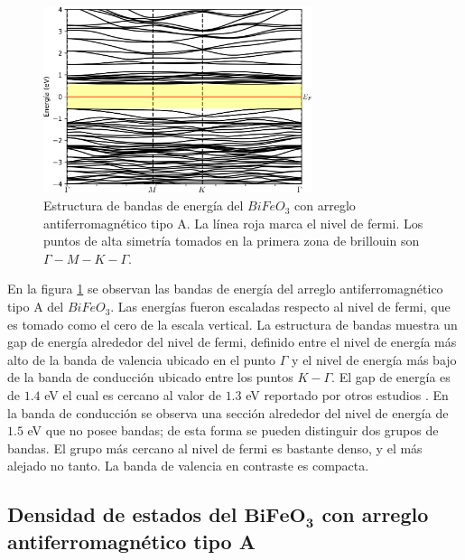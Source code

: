 
\begin{figure}[H]
    \centering
    
    \includegraphics[width=0.7\textwidth]{contenido/resultados/ferrita_bismuto/img_ferrita_bismuto/BiFeO3_bandas_A_inf.png}
    \singlespace
    \caption[Bandas de energ\'ia del $BiFeO_{3}$ con arreglo 
    antiferromagn\'etico tipo A]{Estructura de bandas de energ\'ia del 
        $BiFeO_{3}$ con arreglo antiferromagn\'etico tipo A. La l\'inea roja 
        marca el 
        nivel de fermi. Los puntos de alta simetr\'ia tomados en la primera 
        zona de 
        brillouin son $\Gamma - M - K - \Gamma$.}
    \label{bfo_band_a}
\end{figure}

En la figura \ref{bfo_band_a} se observan las bandas de energ\'ia del arreglo 
antiferromagn\'etico tipo A del $BiFeO_{3}$. Las energ\'ias fueron escaladas 
respecto al nivel de fermi, que es tomado como el cero de la escala vertical. 
La estructura de bandas muestra un 
gap de 
energ\'ia alrededor del nivel de fermi, definido entre el nivel de energ\'ia 
m\'as alto de la banda de valencia ubicado en el punto $\Gamma$ y el nivel de 
energ\'ia m\'as bajo de la banda de conducci\'on ubicado entre los puntos $K - 
\Gamma$. El gap de energ\'ia es de $1.4$ eV el cual es cercano al valor de 
$1.3$ eV 
reportado por otros estudios \cite{ju2009,gujar2007}. En la banda de 
conducci\'on se observa una secci\'on alrededor del nivel de energ\'ia de $1.5$ 
eV que no posee bandas; de esta forma se pueden distinguir dos grupos de 
bandas. El grupo m\'as cercano al nivel de fermi es bastante denso, y el m\'as 
alejado no tanto. La banda de valencia en contraste es compacta.

\subsection{Densidad de estados del $\mathbf{BiFeO_{3}}$ con arreglo 
antiferromagn\'etico tipo A}

